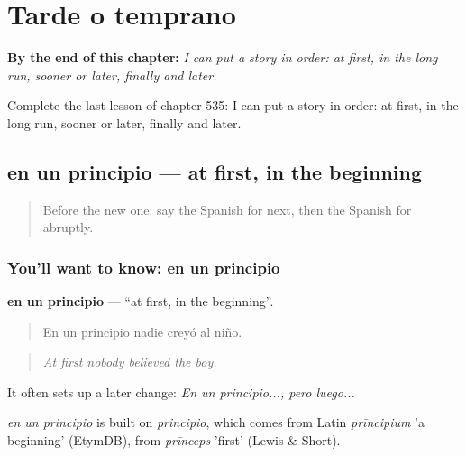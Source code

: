 
\chapter{Tarde o temprano}
\label{ch:es-tarde-o-temprano}

\begin{chapteropening}
\textbf{By the end of this chapter:} \emph{I can put a story in order: at first, in the long run, sooner or later, finally and later.}

Complete the last lesson of chapter 535: I can put a story in order: at first, in the long run, sooner or later, finally and later.
\end{chapteropening}

\section[en un principio]{en un principio — at first, in the beginning}

\label{lesson:ES-C535-en-un-principio}



\begin{quote}
Before the new one: say the Spanish for next, then the Spanish for abruptly.
\end{quote}

\subsection*{You'll want to know: en un principio}
\textbf{en un principio} — \textquotedblleft{}at first, in the beginning\textquotedblright{}.

\begin{quote}
En un principio nadie creyó al niño.
\end{quote}

\begin{quote}
\emph{At first nobody believed the boy.}
\end{quote}

It often sets up a later change: \emph{En un principio..., pero luego...}

\begin{cousinweb}
\emph{en un principio} is built on \emph{principio}, which comes from Latin \emph{prīncipium} 'a beginning' (EtymDB), from \emph{prīnceps} 'first' (Lewis \& Short).
\end{cousinweb}

